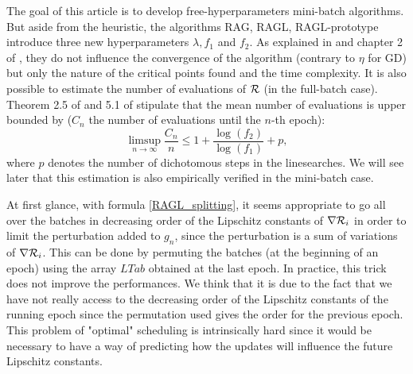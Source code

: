 \begin{remark}
  The goal of this article is to develop free-hyperparameters mini-batch algorithms. But aside from the heuristic, the algorithms RAG, RAGL, RAGL-prototype introduce three new hyperparameters $\lambda, f_1$ and $f_2$. As explained in \cite{Lyap_Theory_Bilel,Bilel_ICML} and chapter 2 of \cite{Bilel_thesis}, they do not influence the convergence of the algorithm (contrary to $\eta$ for GD) but only the nature of the critical points found and the time complexity. It is also possible to estimate the number of evaluations of $\mathcal{R}$ (in the full-batch case). Theorem 2.5 of \cite{Bilel_thesis} and 5.1 of \cite{Bilel_ICML} stipulate that the mean number of evaluations is upper bounded by ($C_n$ the number of evaluations until the $n$-th epoch):
\begin{equation}
	\displaystyle{\limsup_{n\to \infty}}\dfrac{C_n}{n} \leq 1+\frac{\log(f_2)}{\log(f_1)}+p,
	\label{complexity_law}
\end{equation}
where $p$ denotes the number of dichotomous steps in the linesearches. 
We will see later that this estimation is also empirically verified in the mini-batch case.
\end{remark}

\begin{remark}
	At first glance, with formula \eqref{RAGL_splitting}, it seems appropriate to go all over the batches in decreasing order of the Lipschitz constants of $\nabla \mathcal{R}_i$ in order to limit the perturbation added to $g_n$, since the perturbation is a sum of variations of $\nabla \mathcal{R}_i$. This can be done by permuting the batches (at the beginning of an epoch) using the array $LTab$ obtained at the last epoch. In practice, this trick does not improve the performances. We think that it is due to the fact that we have not really access to the decreasing order of the Lipschitz constants of the running epoch since the permutation used gives the order for the previous epoch. This problem of "optimal" scheduling is intrinsically hard since it would be necessary to have a way of predicting how the updates will influence the future Lipschitz constants.   
\end{remark}

